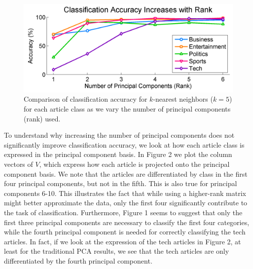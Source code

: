 \documentclass[12pt]{article}
\begin{document}
\begin{figure}[H]
\centering
\includegraphics[width=.6\textwidth]{figures/accuracybyrank}
\caption{Comparison of classification accuracy for $k$-nearest neighbors ($k = 5$) for each article class as we vary the number of principal components (rank) used.}
\label{class_accuracy}
\end{figure}

To understand why increasing the number of principal components does not significantly improve classification accuracy, we look at how each article class is expressed in the principal component basis. In Figure 2 we plot the column vectors of $V$, which express how each article is projected onto the principal component basis. We note that the articles are differentiated by class in the first four principal components, but not in the fifth. This is also true for principal components 6-10. This illustrates the fact that while using a higher-rank matrix might better approximate the data, only the first four significantly contribute to the task of classification. Furthermore, Figure 1 seems to suggest that only the first three principal components are necessary to classify the first four categories, while the fourth principal component is needed for correctly classifying the tech articles. In fact, if we look at the expression of the tech articles in Figure 2, at least for the traditional PCA results, we see that the tech articles are only differentiated by the fourth principal component. 
\end{document}

